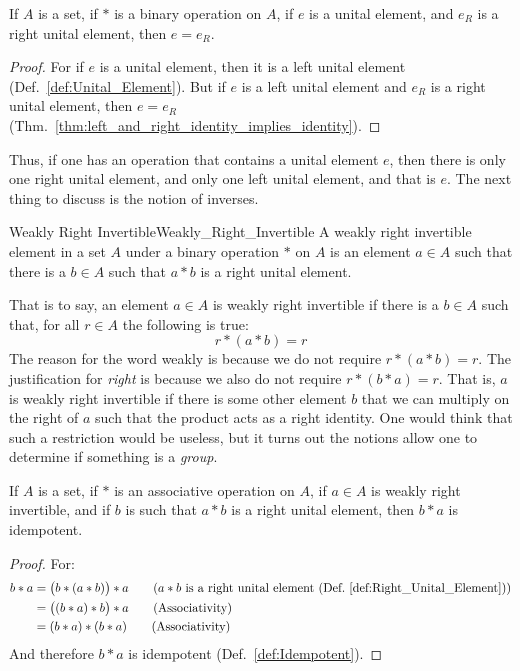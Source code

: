     \begin{theorem}
        If $A$ is a set, if $*$ is a binary operation on $A$, if $e$ is a unital
        element, and $e_{R}$ is a right unital element, then $e=e_{R}$.
    \end{theorem}
    \begin{proof}
        For if $e$ is a unital element, then it is a left unital element
        (Def.~\ref{def:Unital_Element}). But if $e$ is a left unital element and
        $e_{R}$ is a right unital element, then $e=e_{R}$
        (Thm.~\ref{thm:left_and_right_identity_implies_identity}).
    \end{proof}
    Thus, if one has an operation that contains a unital element $e$, then there
    is only one right unital element, and only one left unital element, and that
    is $e$. The next thing to discuss is the notion of inverses.
    \begin{fdefinition}{Weakly Right Invertible}{Weakly_Right_Invertible}
        A weakly right invertible element in a \gls{set} $A$ under a
        \gls{binary operation} $*$ on $A$ is an element $a\in{A}$ such that
        there is a $b\in{A}$ such that $a*b$ is a right unital element.
    \end{fdefinition}
    That is to say, an element $a\in{A}$ is weakly right invertible if there is
    a $b\in{A}$ such that, for all $r\in{A}$ the following is true:
    \begin{equation}
        r*(a*b)=r
    \end{equation}
    The reason for the word weakly is because we do not require $r*(a*b)=r$.
    The justification for \textit{right} is because we also do not require
    $r*(b*a)=r$. That is, $a$ is weakly right invertible if there is some
    other element $b$ that we can multiply on the right of $a$ such that the
    product acts as a right identity. One would think that such a restriction
    would be useless, but it turns out the notions allow one to determine if
    something is a \textit{group}.
    \begin{theorem}
        If $A$ is a set, if $*$ is an associative operation on $A$, if $a\in{A}$
        is weakly right invertible, and if $b$ is such that $a*b$ is a right
        unital element, then $b*a$ is idempotent.
    \end{theorem}
    \begin{proof}
        For:
        \begin{align}
            b*a&=\big(b*(a*b)\big)*a
            \tag{$a*b$ is a right unital element %
                 (Def.~\ref{def:Right_Unital_Element})}\\
            &=\big((b*a)*b\big)*a
            \tag{Associativity}\\
            &=(b*a)*(b*a)
            \tag{Associativity}
        \end{align}
        And therefore $b*a$ is idempotent (Def.~\ref{def:Idempotent}). 
    \end{proof}
